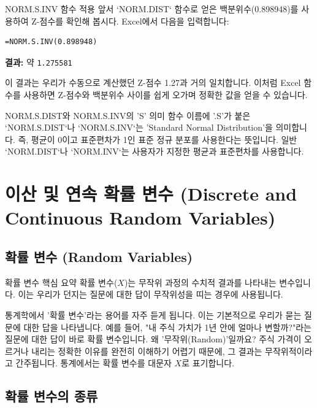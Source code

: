 \documentclass[11pt,a4paper]{article}
\begin{document}
\begin{examplebox}{NORM.S.INV 함수 적용}
앞서 `NORM.DIST` 함수로 얻은 백분위수(0.898948)를 사용하여 Z-점수를 확인해 봅시다.
Excel에서 다음을 입력합니다:
\begin{lstlisting}[language=Excel, caption={NORM.S.INV 함수를 이용한 Z-점수 확인}, label={lst:norm_s_inv_example}]
=NORM.S.INV(0.898948)
\end{lstlisting}
\textbf{결과:} 약 \texttt{1.275581}

이 결과는 우리가 수동으로 계산했던 Z-점수 1.27과 거의 일치합니다. 이처럼 Excel 함수를 사용하면 Z-점수와 백분위수 사이를 쉽게 오가며 정확한 값을 얻을 수 있습니다.

\begin{infobox}{NORM.S.DIST와 NORM.S.INV의 'S' 의미}
함수 이름에 '.S'가 붙은 `NORM.S.DIST`나 `NORM.S.INV`는 'Standard Normal Distribution'을 의미합니다. 즉, 평균이 0이고 표준편차가 1인 표준 정규 분포를 사용한다는 뜻입니다. 일반 `NORM.DIST`나 `NORM.INV`는 사용자가 지정한 평균과 표준편차를 사용합니다.
\end{infobox}
\end{examplebox}

\newpage
\section{이산 및 연속 확률 변수 (Discrete and Continuous Random Variables)}

\subsection{확률 변수 (Random Variables)}

\begin{summarybox}{확률 변수 핵심 요약}
확률 변수(\(X\))는 무작위 과정의 수치적 결과를 나타내는 변수입니다. 이는 우리가 던지는 질문에 대한 답이 무작위성을 띠는 경우에 사용됩니다.
\end{summarybox}

통계학에서 '확률 변수'라는 용어를 자주 듣게 됩니다. 이는 기본적으로 우리가 묻는 질문에 대한 답을 나타냅니다. 예를 들어, "내 주식 가치가 1년 안에 얼마나 변할까?"라는 질문에 대한 답이 바로 확률 변수입니다. 왜 '무작위(Random)'일까요? 주식 가격이 오르거나 내리는 정확한 이유를 완전히 이해하기 어렵기 때문에, 그 결과는 무작위적이라고 간주됩니다. 통계에서는 확률 변수를 대문자 \(X\)로 표기합니다.

\subsection{확률 변수의 종류}
\end{document}
